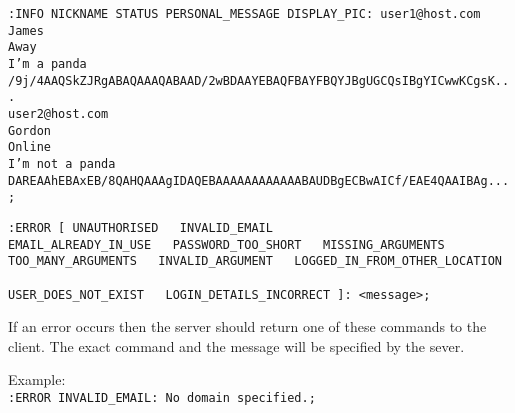 \texttt{:INFO NICKNAME STATUS PERSONAL\_MESSAGE DISPLAY\_PIC: user1@host.com \\
James \\
Away \\
I’m a panda \\
/9j/4AAQSkZJRgABAQAAAQABAAD/2wBDAAYEBAQFBAYFBQYJBgUGCQsIBgYICwwKCgsK... \\
user2@host.com \\
Gordon \\
Online \\
I’m not a panda \\
DAREAAhEBAxEB/8QAHQAAAgIDAQEBAAAAAAAAAAAABAUDBgECBwAICf/EAE4QAAIBAg...;}

\texttt{:ERROR [ UNAUTHORISED \ \vline \ INVALID\_EMAIL \ \vline \ \\ EMAIL\_ALREADY\_IN\_USE \ \vline \ PASSWORD\_TOO\_SHORT \ \vline \ MISSING\_ARGUMENTS \ \vline \ \\ TOO\_MANY\_ARGUMENTS \ \vline \ INVALID\_ARGUMENT \ \vline \ LOGGED\_IN\_FROM\_OTHER\_LOCATION \ \vline \ \\ USER\_DOES\_NOT\_EXIST \ \vline \ LOGIN\_DETAILS\_INCORRECT ]: <message>;}

If an error occurs then the server should return one of these commands to the client. The exact command and the message will be specified by the sever.

Example: \\
\texttt{:ERROR INVALID\_EMAIL: No domain specified.;}

